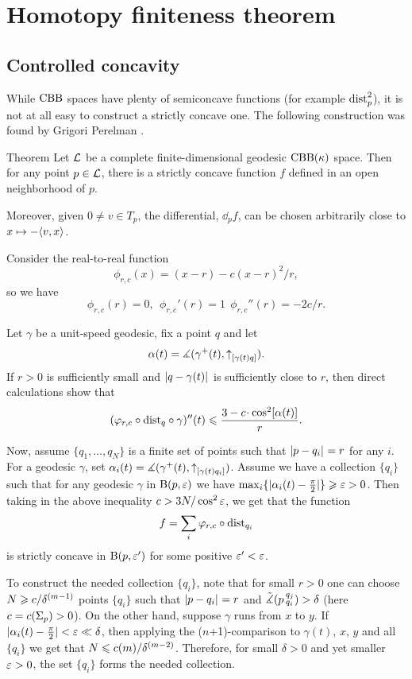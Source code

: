 \chapter{Homotopy finiteness theorem}\label{chap:stability}

\section{Controlled concavity}

While $\mathrm{CBB}$ spaces have plenty of semiconcave functions (for example $\mathrm{dist}_p^2$), 
it is not at all easy to construct a strictly concave one. 
The following construction was found by Grigori Perelman \cite{perelman1993,perelman-petrunin}.


\begin{thm}{Theorem}
\label{thm:strictly-concave}
Let $\mathcal{L}$ be a complete finite-dimensional geodesic $\mathrm{CBB}(\kappa)$ space.
Then for any point $p\in \mathcal{L}$, there is  a strictly concave function $f$ defined in an
open neighborhood of $p$.

Moreover, given $0\ne v\in T_p$, the differential, $\dd_p f$, can be chosen
arbitrarily close to $x\mapsto -\langle v,x\rangle$.
\end{thm}



Consider the real-to-real function 
$$\phi_{r,c}(x)=(x-r)- c{(x-r)^2}/r,$$
so we have 
$$\phi_{r,c}(r)=0,\ \ \phi_{r,c}'(r)=1\ \ \phi_{r,c}''(r)=- {2c}/{r}.$$ 

Let $\gamma$ be a unit-speed geodesic, fix a point $q$ and let 
$$\alpha(t)=\measuredangle(\gamma^+(t),{\uparrow}_{[{\gamma(t)}{q}]}).$$
If $r>0$ is sufficiently small and $\dist q{\gamma(t)}{}$ is sufficiently close to
$r$, then direct calculations show that
$$(\phi_{r,c}\circ\distfun_q\circ\gamma)''(t)
\le 
\frac{3-c\cdot \cos^2[\alpha(t)]}{r}.$$

Now, assume $\{q_1,\dots, q_N\}$ is a finite set of points such that $\dist p{q_i}{}=r$ for any $i$. 
For a geodesic $\gamma$, set $\alpha_i(t)=\measuredangle(\gamma^+(t),{\uparrow}_{[{\gamma(t)}{q_i}]})$. 
Assume we have a collection $\{q_i\}$ such
that for any geodesic $\gamma$ in $\mathrm{B}{}(p,\varepsilon)$
we have $\max_i\{|\alpha_i(t)-\tfrac\pi2|\}\geqslant\varepsilon>0$. 
Then taking in the above inequality $c>3N/\cos^2\varepsilon$, we get that the function
$$f=\sum_i \varphi_{r,c}\circ\mathrm{dist}_{q_i}$$
is strictly concave in $\mathrm{B}{}(p,\varepsilon')$ for some positive $\varepsilon'<\varepsilon$.

To construct the needed collection $\{q_i\}$, note that for small $r>0$ one can
choose $N\geqslant c/\delta^{(m-1)}$ points $\{q_i\}$ such that $\dist{p}{q_i}{}=r$
and $\tilde\measuredangle(p\,{}^{q_j}_{q_i})>\delta$ (here $c=c(\Sigma_p)>0$).
On the other hand, suppose $\gamma$ runs from $x$ to $y$.
If $|\alpha_i(t)- \tfrac\pi2|<\varepsilon\ll\delta$, then applying the ($n$+1)-comparison to $\gamma(t)$, $x$, $y$ and all $\{q_i\}$ we get that
$N\leqslant c(m)/\delta^{(m-2)}$. 
Therefore, for small $\delta>0$ and yet smaller $\varepsilon>0$, the set $\{q_i\}$ forms the needed collection.

